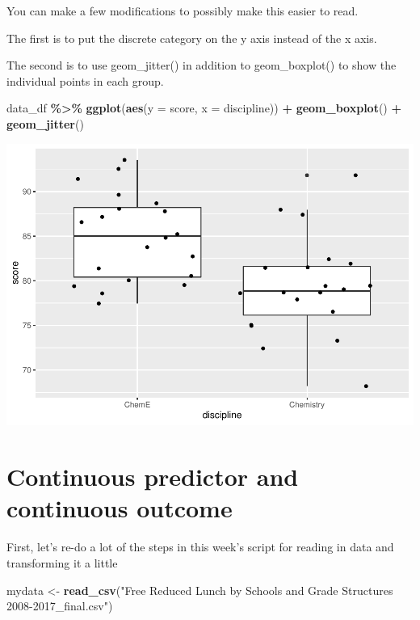 \documentclass[
]{book}
\newenvironment{Shaded}{\begin{snugshade}}{\end{snugshade}}
\newcommand{\DataTypeTok}[1]{\textcolor[rgb]{0.13,0.29,0.53}{#1}}
\newcommand{\KeywordTok}[1]{\textcolor[rgb]{0.13,0.29,0.53}{\textbf{#1}}}
\newcommand{\NormalTok}[1]{#1}
\newcommand{\OperatorTok}[1]{\textcolor[rgb]{0.81,0.36,0.00}{\textbf{#1}}}
\newcommand{\StringTok}[1]{\textcolor[rgb]{0.31,0.60,0.02}{#1}}
\begin{document}
You can make a few modifications to possibly make this easier to read.

The first is to put the discrete category on the y axis instead of the x axis.

The second is to use geom\_jitter() in addition to geom\_boxplot() to show the individual points in each group.

\begin{Shaded}
\begin{Highlighting}[]
\NormalTok{data\_df }\OperatorTok{\%\textgreater{}\%}\StringTok{ }
\StringTok{  }\KeywordTok{ggplot}\NormalTok{(}\KeywordTok{aes}\NormalTok{(}\DataTypeTok{y =}\NormalTok{ score, }\DataTypeTok{x =}\NormalTok{ discipline)) }\OperatorTok{+}
\StringTok{  }\KeywordTok{geom\_boxplot}\NormalTok{() }\OperatorTok{+}
\StringTok{  }\KeywordTok{geom\_jitter}\NormalTok{()}
\end{Highlighting}
\end{Shaded}

\includegraphics{test_course_notes_files/figure-latex/box-and-dot-plot-1.pdf}

\hypertarget{continuous-predictor-and-continuous-outcome}{%
\section{Continuous predictor and continuous outcome}\label{continuous-predictor-and-continuous-outcome}}

First, let's re-do a lot of the steps in this week's script for reading in data and transforming it a little

\begin{Shaded}
\begin{Highlighting}[]
\NormalTok{mydata \textless{}{-}}\StringTok{ }\KeywordTok{read\_csv}\NormalTok{(}\StringTok{"Free Reduced Lunch by Schools and Grade Structures 2008{-}2017\_final.csv"}\NormalTok{)}
\end{Highlighting}
\end{Shaded}
\end{document}

